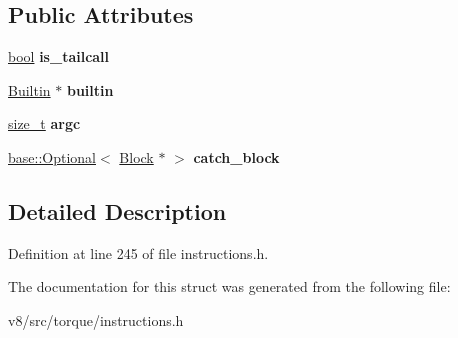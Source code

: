 \subsection*{Public Attributes}
\begin{DoxyCompactItemize}
\item 
\mbox{\label{structv8_1_1internal_1_1torque_1_1CallBuiltinInstruction_ae95762f7c2bba2d69ac01a1f1e8c227b}} 
\mbox{\hyperlink{classbool}{bool}} {\bfseries is\+\_\+tailcall}
\item 
\mbox{\label{structv8_1_1internal_1_1torque_1_1CallBuiltinInstruction_ad8867e10e0e7f0cedccd10337810755b}} 
\mbox{\hyperlink{classv8_1_1internal_1_1torque_1_1Builtin}{Builtin}} $\ast$ {\bfseries builtin}
\item 
\mbox{\label{structv8_1_1internal_1_1torque_1_1CallBuiltinInstruction_a53aac01df501bdb8e6a715a2cf879ccd}} 
\mbox{\hyperlink{classsize__t}{size\+\_\+t}} {\bfseries argc}
\item 
\mbox{\label{structv8_1_1internal_1_1torque_1_1CallBuiltinInstruction_a49f0ffc25060a0a515a19c2f93c6b078}} 
\mbox{\hyperlink{classv8_1_1base_1_1Optional}{base\+::\+Optional}}$<$ \mbox{\hyperlink{classv8_1_1internal_1_1torque_1_1Block}{Block}} $\ast$ $>$ {\bfseries catch\+\_\+block}
\end{DoxyCompactItemize}


\subsection{Detailed Description}


Definition at line 245 of file instructions.\+h.



The documentation for this struct was generated from the following file\+:\begin{DoxyCompactItemize}
\item 
v8/src/torque/instructions.\+h\end{DoxyCompactItemize}
